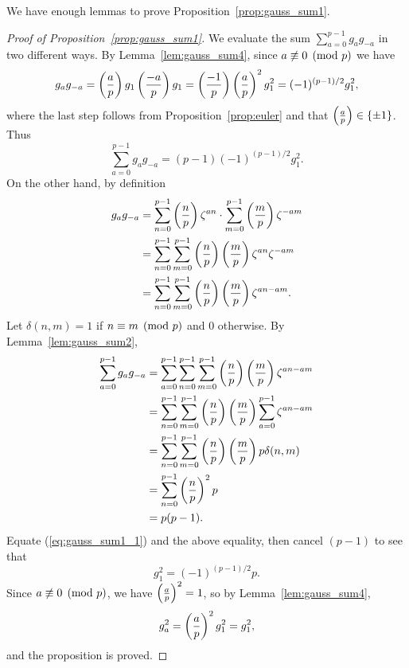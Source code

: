 \noindent{}We have enough lemmas to
prove Proposition~\ref{prop:gauss_sum1}.
\begin{proof}[Proof of Proposition~\ref{prop:gauss_sum1}]
We evaluate the sum $\sum_{a=0}^{p-1} g_a g_{-a}$ in two different ways.  By
Lemma~\ref{lem:gauss_sum4}, since $a\not\equiv 0\pmod{p}$ we have
$$
g_a g_{-a} = \left(\frac{a}{p}\right)g_1\left(\frac{-a}{p}\right)g_1 = \left(\frac{-1}{p}\right)\left(\frac{a}{p}\right)^2 g_1^2 = (-1)^{(p-1)/2} g_1^2,
$$
where the last step follows from Proposition~\ref{prop:euler}
and that $\left(\frac{a}{p}\right)\in\{\pm 1\}$.  Thus
\begin{equation}\label{eq:gauss_sum1_1}
 \sum_{a=0}^{p-1} g_a g_{-a} = (p-1)(-1)^{(p-1)/2}g_1^2.
\end{equation}
On the other hand, by definition
\begin{align*}
  g_a g_{-a} &= \sum_{n=0}^{p-1} \left(\frac{n}{p}\right)\zeta^{an} \cdot \sum_{m=0}^{p-1}\left(\frac{m}{p}\right)\zeta^{-am}\\
             &= \sum_{n=0}^{p-1}\sum_{m=0}^{p-1} \left(\frac{n}{p}\right)\left(\frac{m}{p}\right)\zeta^{an}\zeta^{-am}\\
             &= \sum_{n=0}^{p-1}\sum_{m=0}^{p-1} \left(\frac{n}{p}\right)\left(\frac{m}{p}\right)\zeta^{an-am}.
\end{align*}
Let $\delta(n,m)=1$ if $n\equiv m\pmod{p}$ and $0$ otherwise.
By Lemma~\ref{lem:gauss_sum2},
\begin{align*}
 \sum_{a=0}^{p-1} g_a g_{-a} &= \sum_{a=0}^{p-1}\sum_{n=0}^{p-1}\sum_{m=0}^{p-1} \left(\frac{n}{p}\right)\left(\frac{m}{p}\right)\zeta^{an-am}\\
            &= \sum_{n=0}^{p-1}\sum_{m=0}^{p-1} \left(\frac{n}{p}\right)\left(\frac{m}{p}\right)\sum_{a=0}^{p-1}\zeta^{an-am}\\
            &= \sum_{n=0}^{p-1}\sum_{m=0}^{p-1} \left(\frac{n}{p}\right)\left(\frac{m}{p}\right)p\delta(n,m)\\
            &= \sum_{n=0}^{p-1}\left(\frac{n}{p}\right)^2 p \\
            &= p(p-1).
\end{align*}
Equate (\ref{eq:gauss_sum1_1}) and the above equality,
then cancel $(p-1)$ to see that
$$
g_1^2 =(-1)^{(p-1)/2} p.
$$
Since $a\not\equiv 0\pmod{p}$, we have $\left(\frac{a}{p}\right)^2=1$, so by Lemma~\ref{lem:gauss_sum4},
$$
g_a^2 = \left(\frac{a}{p}\right)^2 g_1^2 = g_1^2,
$$
and the proposition is proved.
\end{proof}

